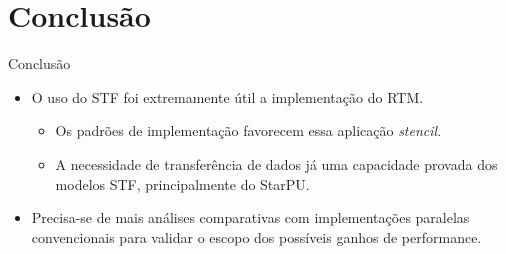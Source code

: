 \documentclass{beamer}
\begin{document}
\section{Conclusão}

\begin{frame}{Conclusão}
  \begin{itemize}
  \item<+-> O uso do STF foi extremamente útil a implementação do RTM.
    \begin{itemize}
    \item<+-> Os padrões de implementação favorecem essa aplicação \textit{stencil}.
    \item<+-> A necessidade de transferência de dados já uma capacidade provada dos modelos STF, principalmente do StarPU.
    \end{itemize}
  \item<+-> Precisa-se de mais análises comparativas com implementações paralelas convencionais para validar o escopo dos possíveis ganhos de performance.
  \end{itemize}
\end{frame}


\backmatter
\end{document}

